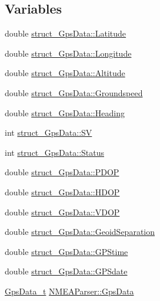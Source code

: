 \subsection*{\-Variables}
\begin{DoxyCompactItemize}
\item 
double \hyperlink{group___g_p_s_gadget_plugin_ga22dd27dba6f143463f812eda429ca6ea}{struct\-\_\-\-Gps\-Data\-::\-Latitude}
\item 
double \hyperlink{group___g_p_s_gadget_plugin_ga63cb298938d490dd35e8a5dbd099f65e}{struct\-\_\-\-Gps\-Data\-::\-Longitude}
\item 
double \hyperlink{group___g_p_s_gadget_plugin_ga7114820c879b9cfa5c6511ee87fb7837}{struct\-\_\-\-Gps\-Data\-::\-Altitude}
\item 
double \hyperlink{group___g_p_s_gadget_plugin_ga96522460814507cd49570c6edbecdc4a}{struct\-\_\-\-Gps\-Data\-::\-Groundspeed}
\item 
double \hyperlink{group___g_p_s_gadget_plugin_ga11eede30f67268e28aac52350a2de20c}{struct\-\_\-\-Gps\-Data\-::\-Heading}
\item 
int \hyperlink{group___g_p_s_gadget_plugin_gad4c8228c92e708ffbf1205af7955a571}{struct\-\_\-\-Gps\-Data\-::\-S\-V}
\item 
int \hyperlink{group___g_p_s_gadget_plugin_gafecfb74415dbfe5f6bc3c950183eb3b2}{struct\-\_\-\-Gps\-Data\-::\-Status}
\item 
double \hyperlink{group___g_p_s_gadget_plugin_ga686c0fa6dc1d7aa494b494fe38bb8834}{struct\-\_\-\-Gps\-Data\-::\-P\-D\-O\-P}
\item 
double \hyperlink{group___g_p_s_gadget_plugin_ga7bea5e7cb8f6a97c8b2be703401218e3}{struct\-\_\-\-Gps\-Data\-::\-H\-D\-O\-P}
\item 
double \hyperlink{group___g_p_s_gadget_plugin_ga0c803c003d3d1261b1519a4b1f561ebe}{struct\-\_\-\-Gps\-Data\-::\-V\-D\-O\-P}
\item 
double \hyperlink{group___g_p_s_gadget_plugin_ga847e7e6776a9a2cdaf8c4cf0ce8e31ae}{struct\-\_\-\-Gps\-Data\-::\-Geoid\-Separation}
\item 
double \hyperlink{group___g_p_s_gadget_plugin_gaeedda11a0db9fe353ca149906deccb9f}{struct\-\_\-\-Gps\-Data\-::\-G\-P\-Stime}
\item 
double \hyperlink{group___g_p_s_gadget_plugin_ga5556ea2f7e4f0fb213a319e72a5961eb}{struct\-\_\-\-Gps\-Data\-::\-G\-P\-Sdate}
\item 
\hyperlink{group___g_p_s_gadget_plugin_ga4f1b5520a42a0033fb4d09fc7cbc2197}{\-Gps\-Data\-\_\-t} \hyperlink{group___g_p_s_gadget_plugin_ga5ed5a691ba188edd73dbfa5e6a72ee31}{\-N\-M\-E\-A\-Parser\-::\-Gps\-Data}

\end{DoxyCompactItemize}

